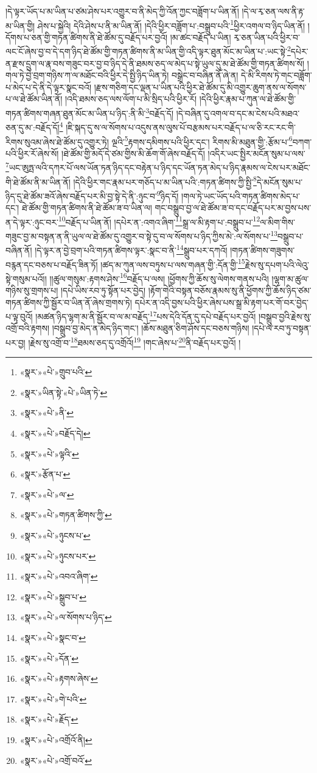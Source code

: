 །དེ་ལྟར་ཡོད་པ་མ་ཡིན་པ་ཙམ་ཤེས་པར་འགྱུར་བ་ནི་མེད་ཀྱི་འོན་ཀྱང་བཟློག་པ་ཡིན་ནོ། །དེ་ལ་རྭ་ཅན་ལས་ནི་རྟ་མ་ཡིན་གྱི། ཤེས་པ་སྐྱེའི། དེའི་ཤེས་པ་ནི་མ་ཡིན་ནོ། །དེའི་ཕྱིར་བཟློག་པ་:བསྒྲུབ་པའི་\footnote{«སྣར་»«པེ་»གྲུབ་པའི་}ཕྱིར་འགལ་བ་ཉིད་ཡིན་ནོ། །དོགས་པ་ཅན་གྱི་གཏན་ཚིགས་ནི་ཐེ་ཚོམ་དུ་བརྗོད་པར་བྱའོ། །མ་ཚང་བརྗོད་པ་ཡིན། རྭ་ཅན་ཡིན་པའི་ཕྱིར་བ་ལང་ངོ་ཞེས་བྱ་བ་དེ་དག་ཉིད་ཐེ་ཚོམ་གྱི་གཏན་ཚིགས་ནི་མ་ཡིན་གྱི་འདི་ལྟར་ཐུན་མོང་མ་ཡིན་པ་:ཡང་སྟེ་\footnote{«སྣར་»ཡིན་སྟེ་«པེ་»ཡིན་ཏེ་}དཔེར་ན་རྫས་དྲུག་ལ་རྣ་བས་གཟུང་བར་བྱ་བ་ཉིད་དེ་ནི་ཐམས་ཅད་ལ་མེད་པ་སྟེ་ཡུལ་དུ་མ་ཐེ་ཚོམ་གྱི་གཏན་ཚིགས་སོ། །གལ་ཏེ་བྱེ་བྲག་གཉིས་ཀ་ལ་མཐོང་བའི་ཕྱིར་དེ་སྤྱི་ཉིད་ཡིན་ཏེ། བསྒྲེང་བ་བཞིན་ནོ་ཞེ་ན། དེ་མི་རིགས་ཏེ་གང་བཟློག་པ་མེད་པ་དེ་ནི་དེ་ལྟར་སྣང་བའོ། །རྫས་གཅིག་དང་ལྡན་པ་ཡིན་པའི་ཕྱིར་ཐེ་ཚོམ་དུ་མི་འགྱུར་ཆུག་ནས་ལ་སོགས་པ་ལ་ཐེ་ཚོམ་ཡིན་ནོ། །འདི་ཐམས་ཅད་ལས་ལོག་པ་མི་སྲིད་པའི་ཕྱིར་རོ། །དེའི་ཕྱིར་རྣམ་པ་ཀུན་ལ་ཐེ་ཚོམ་གྱི་གཏན་ཚིགས་གཞན་ཐུན་མོང་མ་ཡིན་པ་ཉིད་:ནི་མི་\footnote{«སྣར་»«པེ་»ནི་}བརྗོད་དོ། །དེ་བཞིན་དུ་འགལ་བ་དང་མ་ངེས་པའི་མཐའ་ཅན་དུ་མ་:བརྗོད་དོ།\footnote{«སྣར་»«པེ་»བརྗོད་དེ།} །ཇི་སྐད་དུ་ས་ལ་སོགས་པ་འདུས་ནས་ལུས་པོ་བརྩམས་པར་བརྗོད་པ་ལ་ཅི་རང་རང་གི་རིགས་སུའམ་ཞེས་ཐེ་ཚོམ་དུ་འགྱུར་ཏེ། ལྔའི་\footnote{«སྣར་»«པེ་»ལྟའི་}རྟགས་དམིགས་པའི་ཕྱིར་དང་། རིགས་མི་མཐུན་གྱི་:རྩོམ་པ་\footnote{«སྣར་»རྩོན་པ་}བཀག་པའི་ཕྱིར་རོ་ཞེས་སོ། །ཐེ་ཚོམ་གྱི་མདོ་དེ་ཙམ་གྱིས་མི་ཆོག་གོ་ཞེས་བརྗོད་དོ། །འདིར་ཡང་སྤྱིར་མངོན་སུམ་པ་ལས་\footnote{«སྣར་»«པེ་»ལ་}ཡང་ཨུཏྤ་ལའི་དཀར་པོ་ལས་ཡོན་ཏན་ཉིད་དང་བརྟེན་པ་ཉིད་དང་ཡོན་ཏན་མེད་པ་ཉིད་རྣམས་ལ་ངེས་པར་མཐོང་གི་ཐེ་ཚོམ་ནི་མ་ཡིན་ནོ། །དེའི་ཕྱིར་གང་རྣམ་པར་གཅོད་པ་མ་ཡིན་པའི་:གཏན་ཚིགས་ཀྱི་སྤྱི་\footnote{«སྣར་»«པེ་»གཏན་ཚིགས་ཀྱི་}དེ་མངོན་སུམ་པ་ཉིད་དུ་ཐེ་ཚོམ་ཟའོ་ཞེས་བརྗོད་པར་མི་བྱ་སྟེ་དེ་ནི་:ཉུང་བ་\footnote{«སྣར་»«པེ་»ཉུངས་པ་}ཉིད་དོ། །གལ་ཏེ་ཡང་ཡོད་པའི་གཏན་ཚིགས་མེད་པ་དང་། ཐེ་ཚོམ་གྱི་གཏན་ཚིགས་ནི་ཐེ་ཚོམ་ཟ་བ་ཡིན་ལ། གང་བསྒྲུབ་བྱ་ལ་ཐེ་ཚོམ་ཟ་བ་དང་བརྗོད་པར་མ་བྱས་པས་ན་དེ་ལྟར་:ཉུང་བར་\footnote{«སྣར་»«པེ་»ཉུངས་པར་}བརྗོད་པ་ཡིན་ནོ། །དཔེར་ན་:འགའ་ཞིག་\footnote{«སྣར་»«པེ་»འབའ་ཞིག་}སྒྲ་ལ་མི་རྟག་པ་:བསྒྲུབ་པ་\footnote{«སྣར་»«པེ་»སྒྲུབ་པ་}ལ་མིག་གིས་གཟུང་བྱ་མ་བསྟན་ན་ནི་ཡུལ་ལ་ཐེ་ཚོམ་དུ་འགྱུར་བ་སྟེ་དུ་བ་ལ་སོགས་པ་ཉིད་ཀྱིས་མེ་:ལ་སོགས་པ་\footnote{«སྣར་»«པེ་»ལ་སོགས་པ་ཉིད་}བསྒྲུབ་པ་བཞིན་ནོ། །དེ་ལྟར་ན་བྱེ་བྲག་པའི་གཏན་ཚིགས་ལྟར་:སྣང་བ་ནི་\footnote{«སྣར་»«པེ་»སྣང་བ་}སྒྲུབ་པར་དཀའོ། །གཏན་ཚིགས་གཟུགས་བརྙན་དང་བཅས་པ་བརྗོད་ཟིན་ཏོ། །ཚད་མ་ཀུན་ལས་བཏུས་པ་ལས་གཞན་གྱི་:དོན་གྱི་\footnote{«སྣར་»«པེ་»དོན་}རྗེས་སུ་དཔག་པའི་ལེའུ་སྟེ་གསུམ་པའོ།། །།ཚུལ་གསུམ་:རྟགས་ཤེས་\footnote{«སྣར་»«པེ་»རྟགས་ཞེས་}བརྗོད་པ་ལས། །ཕྱོགས་ཀྱི་ཆོས་སུ་ལེགས་གནས་པའི། །ལྷག་མ་ཚུལ་གཉིས་སུ་གྲགས་པ། །དཔེ་ཡིས་རབ་ཏུ་སྟོན་པར་བྱེད། །རྟོག་གེའི་བསྟན་བཅོས་རྣམས་སུ་ནི་ཕྱོགས་ཀྱི་ཆོས་ཉིད་ཙམ་གཏན་ཚིགས་ཀྱི་སྦྱོར་བ་ཡིན་ནོ་ཞེས་གྲགས་ཏེ། དཔེར་ན་འདི་བྱས་པའི་ཕྱིར་ཞེས་པས་སྒྲ་མི་རྟག་པར་གོ་བར་བྱེད་པ་ལྟ་བུའོ། །མཚན་ཉིད་ལྷག་མ་ནི་སྦྱོར་བ་ལ་མ་བརྗོད་\footnote{«སྣར་»«པེ་»གེ་པའི་}པས་དེའི་དོན་དུ་དཔེ་བརྗོད་པར་བྱའོ། །བསྒྲུབ་བྱའི་རྗེས་སུ་འགྲོ་བའི་རྟགས། །བསྒྲུབ་བྱ་མེད་ན་མེད་ཉིད་གང་། །ཆོས་མཐུན་ཅིག་ཤོས་དང་བཅས་གཉིས། །དཔེ་ལ་རབ་ཏུ་བསྟན་པར་བྱ། །རྗེས་སུ་འགྲོ་བ་\footnote{«སྣར་»«པེ་»རྗོད་}ཐམས་ཅད་དུ་འགྲོའོ།\footnote{«སྣར་»«པེ་»འགྲོའོ་ནི།} །གང་ཞེས་པ་\footnote{«སྣར་»«པེ་»འགྲོ་བའོ་}ནི་བརྗོད་པར་བྱའོ། །
